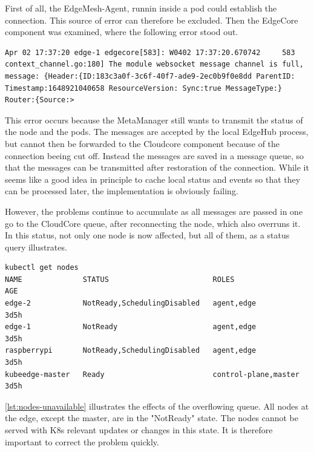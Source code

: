 \documentclass[MSC,Master,english]{twbook}%
\begin{document}
First of all, the EdgeMesh-Agent, runnin inside a pod could establish the connection. This source of error can therefore be excluded. Then the EdgeCore component was examined, where the following error stood out.

\vspace{\baselineskip}
\begin{minipage}{\linewidth}
    \begin{lstlisting}[caption={EdgeCore Error},captionpos=b]
Apr 02 17:37:20 edge-1 edgecore[583]: W0402 17:37:20.670742     583 context_channel.go:180] The module websocket message channel is full, message: {Header:{ID:183c3a0f-3c6f-40f7-ade9-2ec0b9f0e8dd ParentID: Timestamp:1648921040658 ResourceVersion: Sync:true MessageType:} Router:{Source:>
    \end{lstlisting}
\end{minipage}

This error occurs because the MetaManager still wants to transmit the status of the node and the pods. The messages are accepted by the local EdgeHub process, but cannot then be forwarded to the Cloudcore component because of the connection beeing cut off. Instead the messages are saved in a message queue, so that the messages can be transmitted after restoration of the connection. While it seems like a good idea in principle to cache local status and events so that they can be processed later, the implementation is obviously failing. \par

However, the problems continue to accumulate as all messages are passed in one go to the CloudCore queue, after reconnecting the node, which also overruns it. In this status, not only one node is now affected, but all of them, as a status query illustrates.

\begin{lstlisting}[caption={EdgeCore nodes unavailable},captionpos=b,label=lst:nodes-unavailable]
kubectl get nodes
NAME              STATUS                        ROLES                  AGE
edge-2            NotReady,SchedulingDisabled   agent,edge             3d5h
edge-1            NotReady                      agent,edge             3d5h
raspberrypi       NotReady,SchedulingDisabled   agent,edge             3d5h
kubeedge-master   Ready                         control-plane,master   3d5h
\end{lstlisting}

\autoref{lst:nodes-unavailable} illustrates the effects of the overflowing queue. All nodes at the edge, except the master, are in the "NotReady" state. The nodes cannot be served with K8s relevant updates or changes in this state. It is therefore important to correct the problem quickly.\par
\end{document}
